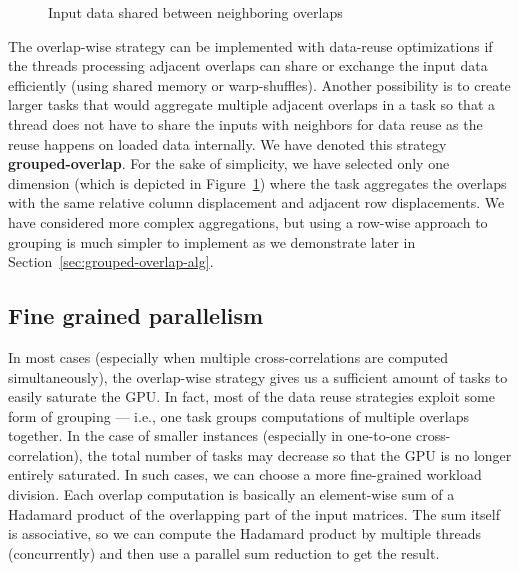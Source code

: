 \begin{figure}[ht]
	\centering
	\def\svgwidth{0.7\textwidth}
	\fontsize{7}{9}\selectfont
	
	\caption{Input data shared between neighboring overlaps}
	\label{fig:overlap_grouped_shared_data}
\end{figure}

The overlap-wise strategy can be implemented with data-reuse optimizations if the threads processing adjacent overlaps can share or exchange the input data efficiently (using shared memory or warp-shuffles). Another possibility is to create larger tasks that would aggregate multiple adjacent overlaps in a task so that a thread does not have to share the inputs with neighbors for data reuse as the reuse happens on loaded data internally. We have denoted this strategy \textbf{grouped-overlap}. For the sake of simplicity, we have selected only one dimension (which is depicted in Figure~\ref{fig:overlap_grouped_shared_data}) where the task aggregates the overlaps with the same relative column displacement and adjacent row displacements. We have considered more complex aggregations, but using a row-wise approach to grouping is much simpler to implement as we demonstrate later in Section~\ref{sec:grouped-overlap-alg}.

\subsection{Fine grained parallelism}

In most cases (especially when multiple cross-correlations are computed simultaneously), the overlap-wise strategy gives us a sufficient amount of tasks to easily saturate the GPU. In fact, most of the data reuse strategies exploit some form of grouping --- i.e., one task groups computations of multiple overlaps together. In the case of smaller instances (especially in one-to-one cross-correlation), the total number of tasks may decrease so that the GPU is no longer entirely saturated. In such cases, we can choose a more fine-grained workload division. Each overlap computation is basically an element-wise sum of a Hadamard product of the overlapping part of the input matrices. The sum itself is associative, so we can compute the Hadamard product by multiple threads (concurrently) and then use a parallel sum reduction to get the result.

